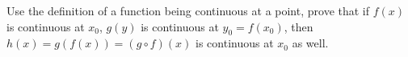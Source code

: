 \begin{exercise}
  \label{ex:hw05:composition-continuity}
  Use the definition of a function being continuous at a point, prove
  that if $f(x)$ is continuous at $x_0$, $g(y)$ is continuous at
  $y_0=f(x_0)$, then $h(x)=g(f(x))=(g\circ f)(x)$ is continuous at
  $x_0$ as well.
\end{exercise}

